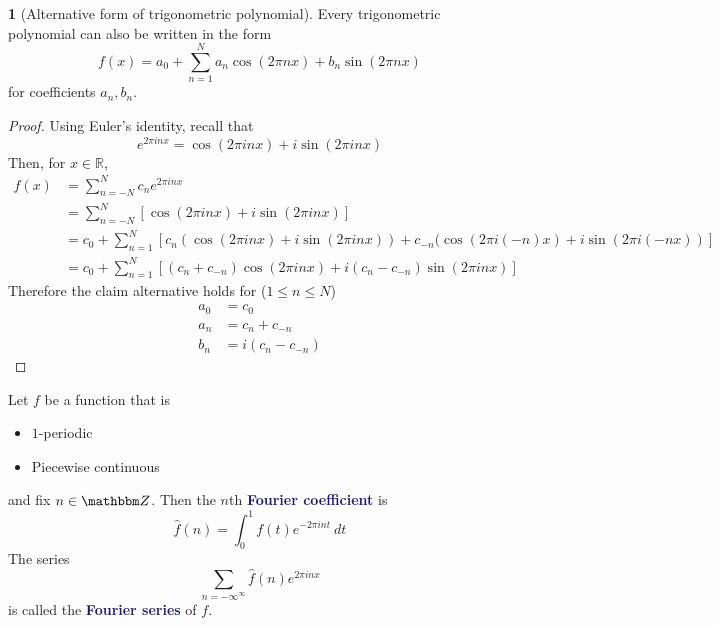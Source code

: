 \documentclass[11pt]{article}
\numberwithin{equation}{section}
\newcommand{\navy}[1]{\textcolor{MidnightBlue}{\bf #1}}
\theoremstyle{definition}
\newtheorem{claim}{\color{ForestGreen}{\textbf{Claim}}}[section]
\theoremstyle{definition}
\newcommand\squares[1]{\left[ #1 \right]}
\newcommand{\1}{\mathbbm 1}
\newcommand{\RR}{\mathbb R}
\newcommand{\ZZ}{\mathbbm Z}
\begin{document}
\begin{claim}[Alternative form of trigonometric polynomial]
	Every trigonometric polynomial can also be written in the form
	\begin{equation}
		f(x) = a_0 + \sum_{n=1}^N a_n \cos(2\pi n x) + b_n \sin(2\pi nx)
	\end{equation}
	for coefficients $a_n, b_n$. 
\end{claim}
\begin{proof}
	Using Euler's identity, recall that
	\begin{equation}
		e^{2\pi i n x} = \cos(2\pi i n x) + i \sin(2\pi i n x)
	\end{equation}
	Then, for $x \in \RR$,
	\begin{align*}
		f(x) &= \sum_{n=-N}^N c_n e^{2\pi i n x} \\
		&= \sum_{n=-N}^N \squares{\cos(2\pi i n x) + i \sin(2\pi i n x)} \\
		&= c_0 + \sum_{n=1}^N \squares{c_n(\cos(2\pi i n x) + i \sin(2\pi i n x)) + c_{-n}(\cos(2\pi i (-n) x) + i \sin(2\pi i (-n x))} \\
		&= c_0 + \sum_{n=1}^N \squares{(c_n + c_{-n})\cos(2\pi i n x) + i(c_n - c_{-n})\sin(2\pi i n x)}
	\end{align*}
	Therefore the claim alternative holds for ($1 \leq n \leq N$)
	\begin{align*}
		a_0 &= c_0 \\
		a_n &= c_n + c_{-n} \\
		b_n &= i(c_n - c_{-n})
	\end{align*}
	
\end{proof}

\begin{definition}
	Let $f$ be a function that is
	\begin{itemize}
		\item $1$-periodic
		\item Piecewise continuous
	\end{itemize}
	and fix $n \in \ZZ$. Then the $n$th \navy{Fourier coefficient} is 
	\begin{equation}
		\hat{f}(n) = \int_0^1 f(t) e^{-2 \pi i n t} \ dt
	\end{equation}
	The series
	\begin{equation}
		\sum_{n=-\infty^\infty} \hat{f}(n) e^{2\pi i n x} 
	\end{equation}
	is called the \navy{Fourier series} of $f$. 
\end{definition}
\end{document}
